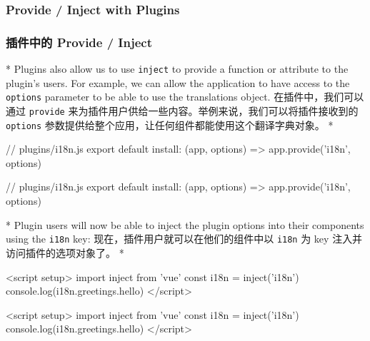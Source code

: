 \begin{paracol}{2}
\subsubsection{Provide / Inject with Plugins}
\switchcolumn
\subsubsection{插件中的 Provide / Inject}
\switchcolumn[0]*%
Plugins also allow us to use \texttt{inject} to provide a function or
attribute to the plugin's users. For example, we can allow the
application to have access to the \texttt{options} parameter to be able
to use the translations object.
\switchcolumn
在插件中，我们可以通过 \texttt{provide}
来为插件用户供给一些内容。举例来说，我们可以将插件接收到的
\texttt{options}
参数提供给整个应用，让任何组件都能使用这个翻译字典对象。
\switchcolumn[0]*%
\begin{codeJs}
// plugins/i18n.js
export default {
  install: (app, options) => {
    app.provide('i18n', options)
  }
}
\end{codeJs}
\switchcolumn
\begin{codeJs}
// plugins/i18n.js
export default {
  install: (app, options) => {
    app.provide('i18n', options)
  }
}
\end{codeJs} 
\switchcolumn[0]*%
Plugin users will now be able to inject the plugin options into their
components using the \texttt{i18n} key:
\switchcolumn
现在，插件用户就可以在他们的组件中以 \texttt{i18n} 为 key
注入并访问插件的选项对象了。
\switchcolumn[0]*%
\begin{codeHtml}
<script setup>
import { inject } from 'vue'
const i18n = inject('i18n')
console.log(i18n.greetings.hello)
</script>
\end{codeHtml}
\switchcolumn
\begin{codeHtml}
<script setup>
import { inject } from 'vue'
const i18n = inject('i18n')
console.log(i18n.greetings.hello)
</script>
\end{codeHtml}
\end{paracol} 

